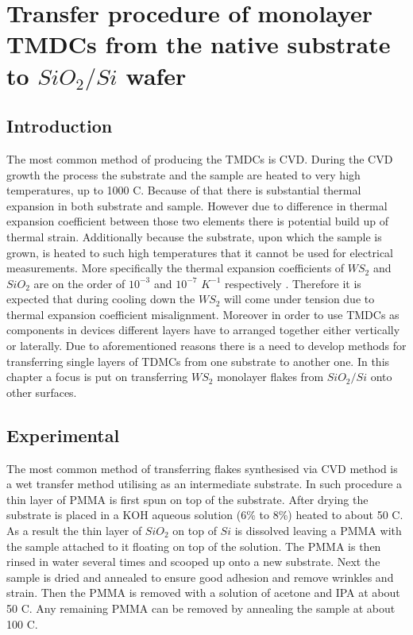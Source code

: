 \chapter{Transfer procedure of monolayer TMDCs from the native substrate to $SiO_2/Si$ wafer}
\label{cha:Transfer}
\section{Introduction}
		The most common method of producing the TMDCs is CVD. During the CVD growth the process the substrate and the sample are heated to very high temperatures, up to 1000 {\degree}C. Because of that there is substantial thermal expansion in both substrate and sample. However due to difference in thermal expansion coefficient between those two elements there is potential build up of thermal strain. Additionally because the substrate, upon which the sample is grown, is heated to such high temperatures that it cannot be used for electrical measurements. More specifically the thermal expansion coefficients of $WS_2$ and $SiO_2$ are on the order of $10^{-3}$ and $10^{-7}$ $K^{-1}$ respectively \cite{Hu2018}\cite{Tada2000}. Therefore it is expected that during cooling down the $WS_2$ will come under tension due to thermal expansion coefficient misalignment. Moreover in order to use TMDCs as components in devices different layers have to arranged together either vertically or laterally. Due to aforementioned reasons there is a need to develop methods for transferring single layers of TDMCs from one substrate to another one. In this chapter a focus is put on transferring $WS_2$ monolayer flakes from $SiO_2/Si$ onto other surfaces.
		
\section{Experimental}
		
	The most common method of transferring flakes synthesised via CVD method is a wet transfer method utilising as an intermediate substrate. In such procedure a thin layer of PMMA is first spun on top of the substrate. After drying the substrate is placed in a KOH aqueous solution (6\% to 8\%) heated to about 50 {\degree}C. As a result the thin layer of $SiO_2$ on top of $Si$ is dissolved leaving a PMMA with the sample attached to it floating on top of the solution. The PMMA is then rinsed in water several times and scooped up onto a new substrate. Next the sample is dried and annealed to ensure good adhesion and remove wrinkles and strain. Then the PMMA is removed with a solution of acetone and IPA at about 50 {\degree}C. Any remaining PMMA can be removed by annealing the sample at about 100 {\degree}C.  
		
